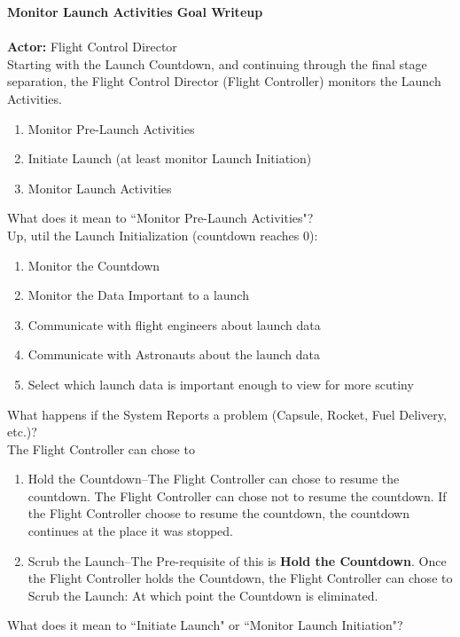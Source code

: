 \documentclass[letterpaper]{article}
\begin{document}
\noindent
\textbf{Monitor Launch Activities Goal Writeup}\\\\
\textbf{Actor:  }Flight Control Director\\
Starting with the Launch Countdown, and continuing through the final
stage separation, the Flight Control Director (Flight Controller)
monitors the Launch Activities.
\begin{enumerate}
\item Monitor Pre-Launch Activities
\item Initiate Launch (at least monitor Launch Initiation)
\item Monitor Launch Activities
\end{enumerate}
What does it mean to ``Monitor Pre-Launch Activities"?\\
Up, util the Launch Initialization (countdown reaches 0):
\begin{enumerate}
\item Monitor the Countdown
\item Monitor the Data Important to a launch
\item Communicate with flight engineers about launch data
\item Communicate with Astronauts about the launch data
\item Select which launch data is important enough to view for more
scutiny
\end{enumerate}
What happens if the System Reports a problem (Capsule, Rocket,
Fuel Delivery, etc.)?\\
The Flight Controller can chose to
\begin{enumerate}
\item Hold the Countdown--The Flight Controller can chose to resume
the countdown.  The Flight Controller can chose not to resume the
countdown.  If the Flight Controller choose to resume the countdown,
the countdown continues at the place it was stopped.
\item Scrub the Launch--The Pre-requisite of this is \textbf{Hold the
Countdown}.  Once the Flight Controller holds the Countdown, the
Flight Controller can chose to Scrub the Launch:  At which point the
Countdown is eliminated.
\end{enumerate}
What does it mean to ``Initiate Launch" or ``Monitor Launch
Initiation"?
\end{document}
